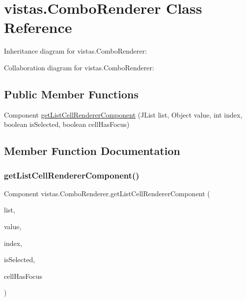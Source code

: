 \hypertarget{classvistas_1_1_combo_renderer}{}\section{vistas.\+Combo\+Renderer Class Reference}
\label{classvistas_1_1_combo_renderer}


Inheritance diagram for vistas.\+Combo\+Renderer\+:


Collaboration diagram for vistas.\+Combo\+Renderer\+:
\subsection*{Public Member Functions}
\begin{DoxyCompactItemize}
\item 
Component \mbox{\hyperlink{classvistas_1_1_combo_renderer_aa9ff9990a50ba210eb3a366c1e18f58b}{get\+List\+Cell\+Renderer\+Component}} (J\+List list, Object value, int index, boolean is\+Selected, boolean cell\+Has\+Focus)
\end{DoxyCompactItemize}


\subsection{Member Function Documentation}
\mbox{\label{classvistas_1_1_combo_renderer_aa9ff9990a50ba210eb3a366c1e18f58b}} 
\subsubsection{\texorpdfstring{get\+List\+Cell\+Renderer\+Component()}{getListCellRendererComponent()}}
{\footnotesize\ttfamily Component vistas.\+Combo\+Renderer.\+get\+List\+Cell\+Renderer\+Component (\begin{DoxyParamCaption}\item[{J\+List}]{list,  }\item[{Object}]{value,  }\item[{int}]{index,  }\item[{boolean}]{is\+Selected,  }\item[{boolean}]{cell\+Has\+Focus }\end{DoxyParamCaption})\hspace{0.3cm}{\ttfamily [inline]}}

